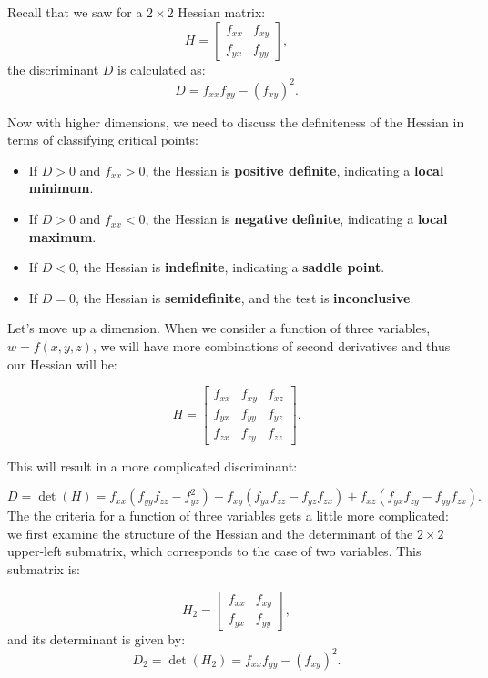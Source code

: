 \noindent Recall that we saw for a \( 2 \times 2 \) Hessian matrix:
\[
H = \begin{bmatrix}
f_{xx} & f_{xy} \\
f_{yx} & f_{yy}
\end{bmatrix},
\]
the discriminant \( D \) is calculated as:
\[
D = f_{xx}f_{yy} - (f_{xy})^2.
\]

\noindent  Now with higher dimensions,  we need to discuss the definiteness of the Hessian in terms of classifying critical points:
\begin{itemize}
    \item If \( D > 0 \) and \( f_{xx} > 0 \), the Hessian is \textbf{positive definite}, indicating a \textbf{local minimum}.
    \item If \( D > 0 \) and \( f_{xx} < 0 \), the Hessian is \textbf{negative definite}, indicating a \textbf{local maximum}.
    \item If \( D < 0 \), the Hessian is \textbf{indefinite}, indicating a \textbf{saddle point}.
    \item If \( D = 0 \), the Hessian is \textbf{semidefinite}, and the test is \textbf{inconclusive}.
\end{itemize}
\noindent Let's move up a dimension. When we consider a function of three variables, \( w = f(x,y,z) \), we will have more combinations of second derivatives and thus our Hessian will be:

\[
H = \begin{bmatrix}
f_{xx} & f_{xy} & f_{xz} \\[5pt]
f_{yx} & f_{yy} & f_{yz} \\[5pt]
f_{zx} & f_{zy} & f_{zz}
\end{bmatrix}.
\]

\noindent This will result in a more complicated discriminant:

\[
D = \det(H) = f_{xx}(f_{yy}f_{zz} - f_{yz}^2) - f_{xy}(f_{yx}f_{zz} - f_{yz}f_{zx}) + f_{xz}(f_{yx}f_{zy} - f_{yy}f_{zx}).
\]
\noindent The the criteria for a function of three variables gets a little more complicated: we first examine the structure of the Hessian and the determinant of the \( 2 \times 2 \) upper-left submatrix, which corresponds to the case of two variables. This submatrix is:

\[
H_2 = \begin{bmatrix}
f_{xx} & f_{xy} \\[5pt]
f_{yx} & f_{yy}
\end{bmatrix},
\]
and its determinant is given by:
\[
D_2 = \det(H_2) = f_{xx}f_{yy} - (f_{xy})^2.
\]

